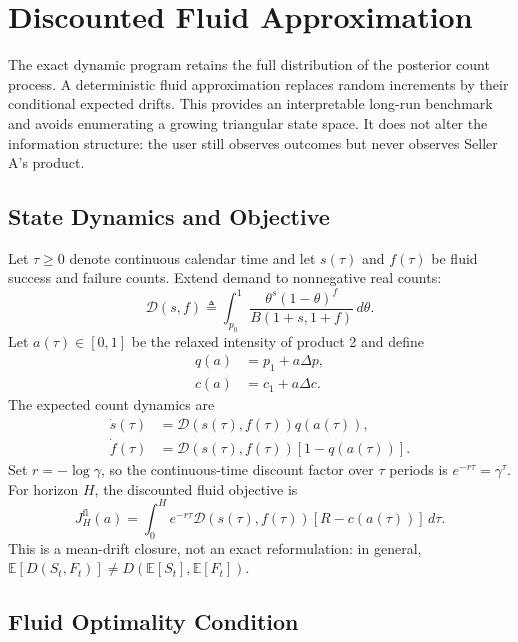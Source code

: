 \documentclass[opre]{informs3}
\newcommand{\E}{\mathbb{E}}
\begin{document}
\section{Discounted Fluid Approximation}

The exact dynamic program retains the full distribution of the posterior count
process. A deterministic fluid approximation replaces random increments by
their conditional expected drifts. This provides an interpretable long-run
benchmark and avoids enumerating a growing triangular state space. It does not
alter the information structure: the user still observes outcomes but never
observes Seller A's product.

\subsection{State Dynamics and Objective}

Let $\tau\geq0$ denote continuous calendar time and let $s(\tau)$ and $f(\tau)$
be fluid success and failure counts. Extend demand to nonnegative real counts:
\begin{equation}
    \mathcal{D}(s,f)
    \triangleq
    \int_{p_0}^{1}
    \frac{\theta^s(1-\theta)^f}{B(1+s,1+f)}\,d\theta.
    \label{eq:fluid-demand}
\end{equation}
Let $a(\tau)\in[0,1]$ be the relaxed intensity of product 2 and define
\begin{align}
    q(a)&=p_1+a\Delta p,\\
    c(a)&=c_1+a\Delta c.
\end{align}
The expected count dynamics are
\begin{align}
    \dot{s}(\tau)
    &=
    \mathcal{D}(s(\tau),f(\tau))q(a(\tau)),
    \label{eq:fluid-success}\\
    \dot{f}(\tau)
    &=
    \mathcal{D}(s(\tau),f(\tau))[1-q(a(\tau))].
    \label{eq:fluid-failure}
\end{align}
Set $r=-\log\gamma$, so the continuous-time discount factor over $\tau$ periods
is $e^{-r\tau}=\gamma^\tau$. For horizon $H$, the discounted fluid objective is
\begin{equation}
    J_H^{\mathrm{fl}}(a)
    =
    \int_0^H
    e^{-r\tau}
    \mathcal{D}(s(\tau),f(\tau))
    [R-c(a(\tau))]\,d\tau.
    \label{eq:fluid-objective}
\end{equation}
This is a mean-drift closure, not an exact reformulation: in general,
$\E[D(S_t,F_t)]\neq D(\E[S_t],\E[F_t])$.

\subsection{Fluid Optimality Condition}
\end{document}
